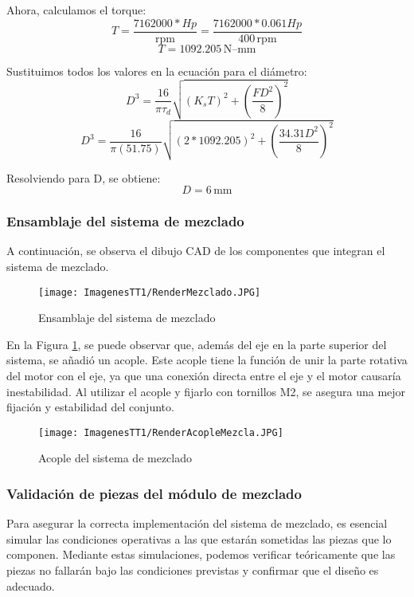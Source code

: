 \documentclass[14pt,oneside]{extarticle} %
\begin{document}
Ahora, calculamos el torque:
\[
T = \frac{7162000 \ast Hp}{\text{rpm}} = \frac{7162000 \ast 0.061Hp}{400\, \text{rpm}}
\]
\[ T = 1092.205\, \text{N} \text{--} \text{mm} \]

Sustituimos todos los valores en la ecuación para el diámetro:
\[ D^3 = \frac{16}{\pi \tau_d} \sqrt{(K_sT)^2 + \left(\frac{FD^2}{8}\right)^2} \]
\[ D^3 = \frac{16}{\pi(51.75)} \sqrt{(2 \ast 1092.205)^2 + \left(\frac{34.31D^2}{8}\right)^2} \]

Resolviendo para D, se obtiene:
\[ D = 6\, \text{mm} \]

\subsubsection{Ensamblaje del sistema de mezclado}

A continuación, se observa el dibujo CAD de los componentes que integran el sistema de mezclado.

\begin{figure}[H]
    \centering
    \texttt{[image: ImagenesTT1/RenderMezclado.JPG]}
    \caption{Ensamblaje del sistema de mezclado}
    \label{fig:SistemaMezclado}
\end{figure}

En la Figura \ref{fig:SistemaMezclado}, se puede observar que, además del eje en la parte superior del sistema, se añadió un acople. Este acople tiene la función de unir la parte rotativa del motor con el eje, ya que una conexión directa entre el eje y el motor causaría inestabilidad. Al utilizar el acople y fijarlo con tornillos M2, se asegura una mejor fijación y estabilidad del conjunto.

\begin{figure}[H]
    \centering
    \texttt{[image: ImagenesTT1/RenderAcopleMezcla.JPG]}
    \caption{Acople del sistema de mezclado}
    \label{fig:acople_mezclado}
\end{figure}

\subsubsection{Validación de piezas del módulo de mezclado}

Para asegurar la correcta implementación del sistema de mezclado, es esencial simular las condiciones operativas a las que estarán sometidas las piezas que lo componen. Mediante estas simulaciones, podemos verificar teóricamente que las piezas no fallarán bajo las condiciones previstas y confirmar que el diseño es adecuado.
\end{document}
